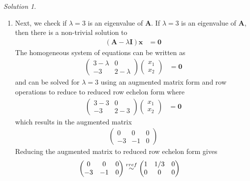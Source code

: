 \documentclass[
]{book}
\providecommand{\tightlist}{%
  \setlength{\itemsep}{0pt}\setlength{\parskip}{0pt}}
\theoremstyle{definition}
\theoremstyle{definition}
\theoremstyle{definition}
\theoremstyle{definition}
\theoremstyle{remark}
\newtheorem*{solution}{Solution}
\begin{document}
\begin{solution}
\begin{enumerate}
\def\labelenumi{\alph{enumi})}
\setcounter{enumi}{2}
\tightlist
\item
  Next, we check if \(\lambda = 3\) is an eigenvalue of \(\mathbf{A}\). If \(\lambda = 3\) is an eigenvalue of \(\mathbf{A}\), then there is a non-trivial solution to
  \[
  \begin{aligned}
  \left( \mathbf{A} - \lambda\mathbf{I} \right) \mathbf{x} & = \mathbf{0}
  \end{aligned}
  \]
  The homogeneous system of equations can be written as
  \[
  \begin{aligned}
  \begin{pmatrix} 
  3  - \lambda & 0 \\
  -3 & 2 - \lambda 
  \end{pmatrix} \begin{pmatrix} x_1 \\ x_2 \end{pmatrix} & = \mathbf{0}
  \end{aligned}
  \]
  and can be solved for \(\lambda = 3\) using an augmented matrix form and row operations to reduce to reduced row echelon form where
  \[
  \begin{aligned}
  \begin{pmatrix} 
  3  - 3 & 0 \\
  -3 & 2 - 3
  \end{pmatrix} \begin{pmatrix} x_1 \\ x_2 \end{pmatrix} & = \mathbf{0}
  \end{aligned}
  \]
  which results in the augmented matrix
  \[
  \begin{aligned}
  \begin{pmatrix} 0 & 0 & 0 \\ -3 & -1 & 0 \end{pmatrix}
  \end{aligned}
  \]
  Reducing the augmented matrix to reduced row echelon form gives
  \[
  \begin{aligned}
  \begin{pmatrix} 0 & 0 & 0 \\ -3 & -1 & 0 \end{pmatrix} & \stackrel{rref}{\huge \sim} \begin{pmatrix} 1 & 1/3 & 0 \\ 0 & 0 & 0 \end{pmatrix}
  \end{aligned}
\]
\end{enumerate}
\end{solution}
\end{document}
